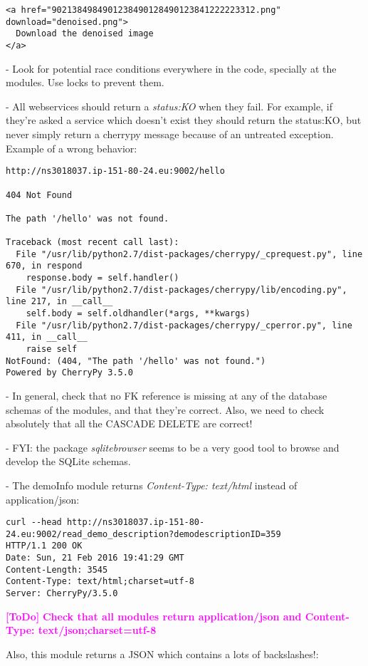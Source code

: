 \documentclass[a4paper,12pt]{article}
\newcommand{\ToDo}[1]{\textcolor{magenta}{\textbf{[ToDo]} \textbf{#1}}}
\begin{document}
\begin{verbatim}
<a href="9021384984901238490128490123841222223312.png" download="denoised.png">
  Download the denoised image
</a>
\end{verbatim}

- Look for potential race conditions everywhere in the code, specially at the modules. Use locks to prevent them.

- All webservices should return a \emph{status:KO} when they fail. For example, if they're asked a service which doesn't exist they should return the status:KO, but never simply return a cherrypy message because of an untreated exception. Example of a wrong behavior:

\begin{verbatim}
http://ns3018037.ip-151-80-24.eu:9002/hello

404 Not Found

The path '/hello' was not found.

Traceback (most recent call last):
  File "/usr/lib/python2.7/dist-packages/cherrypy/_cprequest.py", line 670, in respond
    response.body = self.handler()
  File "/usr/lib/python2.7/dist-packages/cherrypy/lib/encoding.py", line 217, in __call__
    self.body = self.oldhandler(*args, **kwargs)
  File "/usr/lib/python2.7/dist-packages/cherrypy/_cperror.py", line 411, in __call__
    raise self
NotFound: (404, "The path '/hello' was not found.")
Powered by CherryPy 3.5.0
\end{verbatim}

- In general, check that no FK reference is missing at any of the database schemas of the modules, and that they're correct.
Also, we need to check absolutely that all the CASCADE DELETE are correct!

- FYI: the package \emph{sqlitebrowser} seems to be a very good tool to browse and develop the SQLite schemas.

- The demoInfo module returns \emph{Content-Type: text/html} instead of application/json:

\begin{verbatim}
curl --head http://ns3018037.ip-151-80-24.eu:9002/read_demo_description?demodescriptionID=359
HTTP/1.1 200 OK
Date: Sun, 21 Feb 2016 19:41:29 GMT
Content-Length: 3545
Content-Type: text/html;charset=utf-8
Server: CherryPy/3.5.0
\end{verbatim}
\ToDo{Check that all modules return application/json and Content-Type: text/json;charset=utf-8}

Also, this module returns a JSON which contains a lots of backslashes!:
\end{document}
